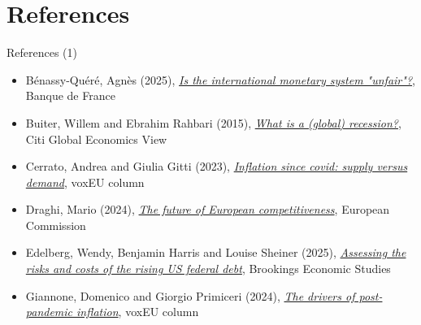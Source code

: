 \documentclass[10pt,handout]{beamer}
\begin{document}
\section{References}
\footnotesize

\begin{frame}{References (1)}
\begin{itemize}

    \item Bénassy-Quéré, Agnès (2025), \href{https://www.banque-france.fr/en/governors-interventions/international-monetary-system-unfair}{\emph{Is the international monetary system "unfair"?}}, Banque de France 

    \item Buiter, Willem and Ebrahim Rahbari (2015),  \href{https://ir.citi.com/p\%2FJ9Uj80\%2BaxALKreeY0Z1vUZImlOZOLlB6g4Rv8kllN5sDCBZyPvGe3ti1Rfq\%2BSM}{\emph{What is a (global) recession?}}, Citi Global Economics View

    \item Cerrato, Andrea and Giulia Gitti (2023), \href{https://cepr.org/voxeu/columns/inflation-covid-demand-or-supply}{\emph{Inflation since covid: supply versus demand}}, voxEU column

    \item Draghi, Mario (2024), \href{https://commission.europa.eu/document/download/97e481fd-2dc3-412d-be4c-f152a8232961_en?filename=The\%20future\%20of\%20European\%20competitiveness\%20\_\%20A\%20competitiveness\%20strategy\%20for\%20Europe.pdf}{\emph{The future of European competitiveness}}, European Commission

    \item Edelberg, Wendy, Benjamin Harris and Louise Sheiner (2025), \href{https://www.brookings.edu/wp-content/uploads/2025/02/20240212_ES_EdelbergHarrisSheiner_Debt_final1.pdf}{\emph{Assessing the risks and costs of the rising US federal debt}}, Brookings Economic Studies

    \item Giannone, Domenico and Giorgio Primiceri (2024), \href{https://cepr.org/voxeu/columns/drivers-post-pandemic-inflation}{\emph{The drivers of post-pandemic inflation}}, voxEU column

\end{itemize}
\end{frame}
\end{document}
